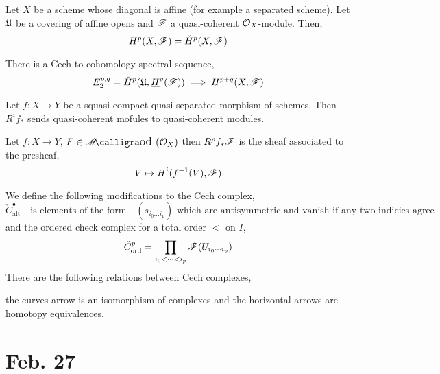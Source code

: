 \documentclass[12pt]{article}
\begin{document}
\begin{corollary}
Let $X$ be a scheme whose diagonal is affine (for example a separated scheme). Let $\mathfrak{U}$ be a covering of affine opens and $\mathscr{F}$ a quasi-coherent $\mathcal{O}_{X}$-module. Then,
\[ H^p(X, \mathscr{F}) = \check{H}^p(X, \mathscr{F}) \]
\end{corollary}

\begin{rmk}
There is a Cech to cohomology spectral sequence,
\[ E_2^{p,q} = \check{H}^p(\mathfrak{U}, \underline{H}^q(\mathscr{F})) \implies H^{p+q}(X, \mathscr{F}) \]
\end{rmk}

\begin{corollary}
Let $f : X \to Y$ be a squasi-compact quasi-separated morphism of schemes. Then $R^i f_*$ sends quasi-coherent mofules to quasi-coherent modules.
\end{corollary}

\begin{lemma}
Let $f : X \to Y$, $F \in \shMod{\struct{X}}$ then $R^p f_* \mathscr{F}$ is the sheaf associated to the presheaf,
\[ V \mapsto H^i(f^{-1}(V), \mathscr{F}) \]
\end{lemma}

\begin{prop}
We define the following modifications to the Cech complex,
\[ \check{C}^\bullet_{\text{alt}} \quad \text{is elements of the form} \quad (s_{i_0 \dots i_p}) \text{ which are antisymmetric and vanish if any two indicies agree} \]
and the ordered check complex for a total order $<$ on $I$,
\[ \check{C}^p_{\text{ord}} = \prod_{i_0  < \cdots < i_p} \mathscr{F}(U_{i_0 \cdots i_p}) \]
There are the following relations between Cech complexes,
\begin{center}
\end{center}
the curves arrow is an isomorphism of complexes and the horizontal arrows are homotopy equivalences. 
\end{prop}

\section{Feb. 27}
\end{document}
